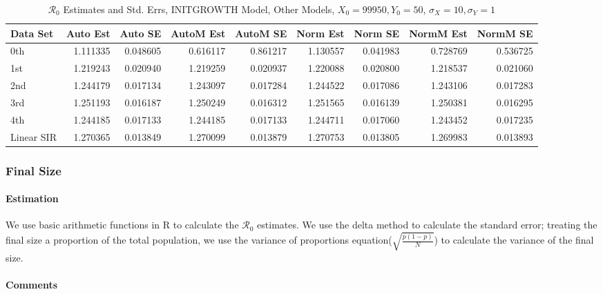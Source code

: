 \documentclass[12pt]{article}
\newcommand{\rr}{\ensuremath{\mathcal{R}_0}}
\begin{document}
\begin{table}[H]
	
	\caption{$\rr$ Estimates and Std. Errs, INITGROWTH Model,
		Other Models, $X_0 = 99950, Y_0 = 50$, 
		$\sigma_X = 10, \sigma_Y = 1$}
	\begin{footnotesize}
		\hskip -1cm
		\begin{tabular}{l|r|r|r|r|r|r|r|r}
			\hline
			Data Set & Auto Est & Auto SE & AutoM Est & AutoM SE & Norm Est & Norm SE & NormM Est & NormM SE\\
			\hline
			0th & 1.111335 & 0.048605 & 0.616117 & 0.861217 & 1.130557 & 0.041983 & 0.728769 & 0.536725\\
			\hline
			1st & 1.219243 & 0.020940 & 1.219259 & 0.020937 & 1.220088 & 0.020800 & 1.218537 & 0.021060\\
			\hline
			2nd & 1.244179 & 0.017134 & 1.243097 & 0.017284 & 1.244522 & 0.017086 & 1.243106 & 0.017283\\
			\hline
			3rd & 1.251193 & 0.016187 & 1.250249 & 0.016312 & 1.251565 & 0.016139 & 1.250381 & 0.016295\\
			\hline
			4th & 1.244185 & 0.017133 & 1.244185 & 0.017133 & 1.244711 & 0.017060 & 1.243452 & 0.017235\\
			\hline
			Linear SIR & 1.270365 & 0.013849 & 1.270099 & 0.013879 & 1.270753 & 0.013805 & 1.269983 & 0.013893\\
			\hline
		\end{tabular}
	\end{footnotesize}
\end{table}

\subsubsection{Final Size}

\paragraph{Estimation}

We use basic arithmetic functions in R to calculate the $\rr$ estimates. We use the delta method to calculate the standard error; treating the final size a proportion of the total population, we use the variance of proportions equation($ \sqrt{\frac{p(1-p)}{N}}$) to calculate the variance of the final size.

\paragraph{Comments}
\end{document}
